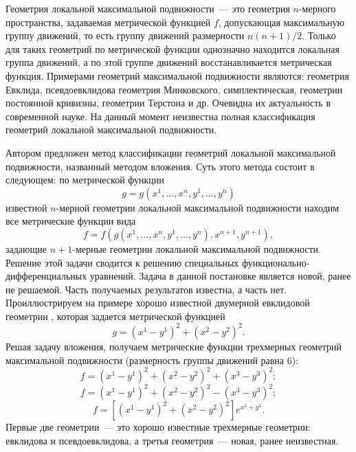 Геометрия локальной максимальной подвижности~--- это геометрия $n$-мерного пространства, задаваемая метрической функцией $f$, допускающая максимальную группу движений, то есть группу движений размерности $n(n+1)/2$. Только для таких геометрий по метрической функции однозначно находится локальная группа движений, а по этой группе движений восстанавливается метрическая функция. Примерами геометрий максимальной подвижности являются: геометрия Евклида, псевдоевклидова геометрия Минковского, симплектическая, геометрии постоянной кривизны, геометрии Терстона и др. Очевидна их актуальность в современной науке. На данный момент неизвестна полная классификация геометрий локальной максимальной подвижности.

Автором предложен метод классификации геометрий локальной максимальной подвижности, названный методом вложения. Суть этого метода состоит в следующем: по метрической функции $$ g = g(x^1,\ldots,x^{n},y^1,\ldots,y^{n}) $$
известной $n$-мерной геометрии локальной максимальной подвижности находим все метрические функции вида $$ f = f(g(x^1,\ldots,x^{n},y^1,\ldots,y^{n}),x^{n+1},y^{n+1}), $$ задающие $n+1$-мерные геометрии локальной максимальной подвижности. Решение этой задачи сводится к решению специальных функционально-дифференциальных уравнений. Задача в данной постановке является новой, ранее не решаемой. Часть получаемых результатов известна, а часть нет.
Проиллюстрируем на примере хорошо известной двумерной евклидовой геометрии \cite{kyrov1}, которая задается метрической функцией $$ g = (x^1 - y^{1})^2 + (x^2 - y^{2})^2. $$ Решая задачу вложения, получаем метрические функции трехмерных геометрий максимальной подвижности (размерность группы движений равна 6): $$ f = (x^1 - y^{1})^2 + (x^2 - y^{2})^2 + (x^3-y^3)^2; $$
$$ f = (x^1 - y^{1})^2 + (x^2 - y^{2})^2 - (x^3-y^3)^2; $$  $$ f = [(x^1 - y^{1})^2 + (x^2 - y^{2})^2]e^{x^3+y^3}. $$ Первые две геометрии~--- это хорошо известные трехмерные геометрии: евклидова и псевдоевклидова, а третья геометрия~--- новая, ранее неизвестная.




